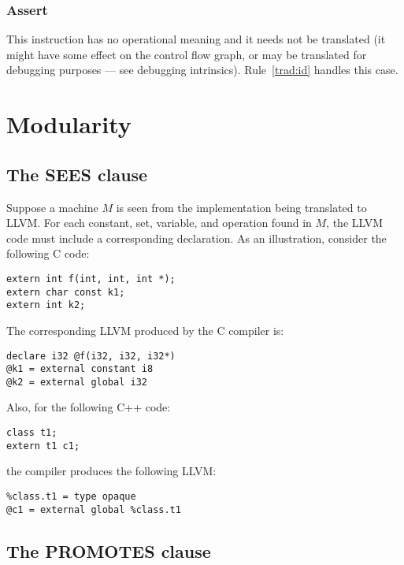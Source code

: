 \documentclass{article}
\begin{document}

\subsubsection{Assert}

This instruction has no operational meaning and it needs not be
translated (it might have some effect on the control flow graph, or
may be translated for debugging purposes --- see debugging
intrinsics). Rule~\ref{trad:id} handles this case.

\section{Modularity}

\subsection{The SEES clause}

Suppose a machine $M$ is seen from the implementation being translated
to LLVM. For each constant, set, variable, and operation found in $M$,
the LLVM code must include a corresponding declaration. As an
illustration, consider the following C code:
\begin{verbatim}
extern int f(int, int, int *);
extern char const k1;
extern int k2;
\end{verbatim}
The corresponding LLVM produced by the C compiler is:
\begin{verbatim}
declare i32 @f(i32, i32, i32*)
@k1 = external constant i8
@k2 = external global i32
\end{verbatim}
Also, for the following C++ code:
\begin{verbatim}
class t1;
extern t1 c1;
\end{verbatim}
the compiler produces the following LLVM:
\begin{verbatim}
%class.t1 = type opaque
@c1 = external global %class.t1
\end{verbatim}

\subsection{The PROMOTES clause}
\end{document}
